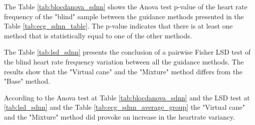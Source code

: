 \begin{table}[!htb]
    \begin{minipage}{.45\linewidth}
        
    \end{minipage}
    \hfill
    \begin{minipage}{.45\linewidth}
        \vspace{-2.75cm}
        
    \end{minipage}
\end{table}

The Table \ref{tab:blocdanova_sdnn} shows the Anova test p-value of the heart rate frequency of the "blind" sample between the guidance methods presented in the Table \ref{tab:ecg_sdnn_table}. The p-value indicates that there is at least one method that is statistically equal to one of the other methods.



The Table \ref{tab:lsd_sdnn} presents the conclusion of a pairwise Fisher LSD test of the blind heart rate frequency variation between all the guidance methods. The results show that the "Virtual cane" and the "Mixture" method differs from the "Base" method.



According to the Anova test at Table \ref{tab:blocdanova_sdnn} and the LSD test at \ref{tab:lsd_sdnn} and the Table \ref{tab:ecg_sdnn_average_group} the "Virtual cane" and the "Mixture" method did provoke an increase in the heartrate variancy.

\FloatBarrier